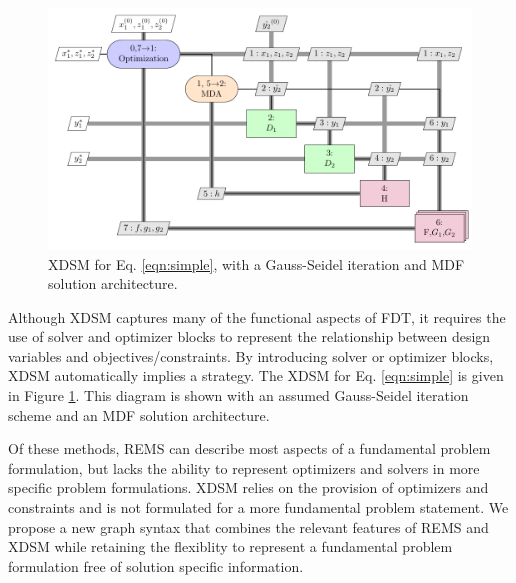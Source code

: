     \begin{figure}
        \begin{center}
        \includegraphics[height=.25\textheight]{XDSM/simple}
        \caption{XDSM for Eq. \ref{eqn:simple}, with a Gauss-Seidel iteration 
          and MDF solution architecture. \label{fig:XDSM_simple}}
        \end{center}
    \end{figure}

    Although XDSM captures many of the functional aspects of FDT, it 
    requires the use of solver and optimizer blocks to represent 
    the relationship between design variables and objectives/constraints. 
    By introducing solver or optimizer blocks, XDSM automatically implies a strategy. 
    The XDSM for Eq. \ref{eqn:simple} is given in Figure \ref{fig:XDSM_simple}. 
    This diagram is shown with an 
    assumed Gauss-Seidel iteration scheme and an MDF solution architecture. 

    Of these methods, REMS can describe most aspects of a fundamental 
    problem formulation, but lacks the ability to represent optimizers and 
    solvers in more specific problem formulations. XDSM relies on the provision of  
    optimizers and constraints and is not formulated  
    for a more fundamental problem statement. We propose a new graph syntax that 
    combines the relevant features of REMS and XDSM while retaining the flexiblity to 
    represent a fundamental problem formulation free of solution specific information. 

